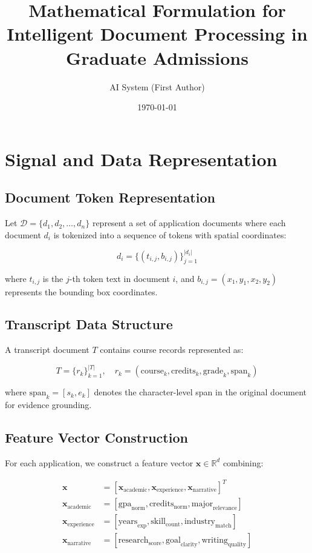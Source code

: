 \documentclass[11pt]{article}
\title{Mathematical Formulation for Intelligent Document Processing in Graduate Admissions}
\author{AI System (First Author)}
\date{\today}
\begin{document}
\maketitle

\section{Signal and Data Representation}

\subsection{Document Token Representation}
Let $\mathcal{D} = \{d_1, d_2, \ldots, d_n\}$ represent a set of application documents where each document $d_i$ is tokenized into a sequence of tokens with spatial coordinates:

\begin{equation}
d_i = \{(t_{i,j}, b_{i,j})\}_{j=1}^{|d_i|}
\end{equation}

where $t_{i,j}$ is the $j$-th token text in document $i$, and $b_{i,j} = (x_1, y_1, x_2, y_2)$ represents the bounding box coordinates.

\subsection{Transcript Data Structure}
A transcript document $T$ contains course records represented as:

\begin{equation}
T = \{r_k\}_{k=1}^{|T|}, \quad r_k = (\text{course}_k, \text{credits}_k, \text{grade}_k, \text{span}_k)
\end{equation}

where $\text{span}_k = [s_k, e_k]$ denotes the character-level span in the original document for evidence grounding.

\subsection{Feature Vector Construction}
For each application, we construct a feature vector $\mathbf{x} \in \mathbb{R}^d$ combining:

\begin{align}
\mathbf{x} &= [\mathbf{x}_{\text{academic}}, \mathbf{x}_{\text{experience}}, \mathbf{x}_{\text{narrative}}]^T \\
\mathbf{x}_{\text{academic}} &= [\text{gpa}_{\text{norm}}, \text{credits}_{\text{norm}}, \text{major}_{\text{relevance}}] \\
\mathbf{x}_{\text{experience}} &= [\text{years}_{\text{exp}}, \text{skill}_{\text{count}}, \text{industry}_{\text{match}}] \\
\mathbf{x}_{\text{narrative}} &= [\text{research}_{\text{score}}, \text{goal}_{\text{clarity}}, \text{writing}_{\text{quality}}]
\end{align}
\end{document}

